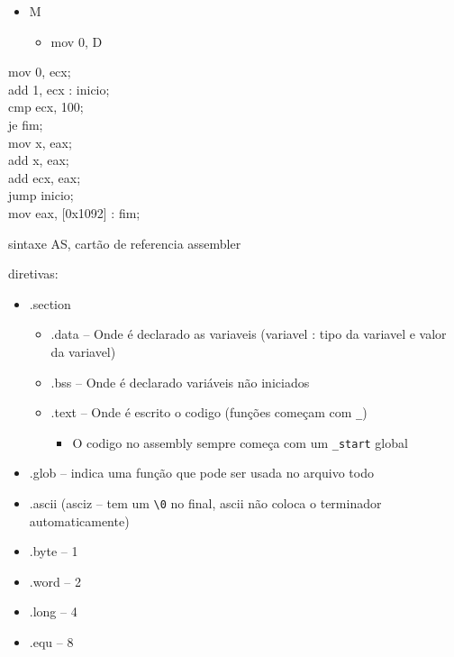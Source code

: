 \documentclass[12pt]{article}
\begin{document}
\begin{itemize}
\begin{itemize}
        \begin{itemize}
            \item Jump
            \item J?
            \begin{itemize}
                \item e
                \item g
                \item l
                \item ge
                \item le
                \item z
                \item \ldots
            \end{itemize}
        \end{itemize}
        \item M
        \begin{itemize}
            \item mov 0, D
        \end{itemize}
    \end{itemize}
\end{itemize}
mov 0, ecx;\\
add 1, ecx : inicio;\\
cmp ecx, 100;\\
je fim;\\
mov x, eax;\\
add x, eax;\\
add ecx, eax;\\
jump inicio;\\
mov eax, [0x1092] : fim;

sintaxe AS, cartão de referencia assembler

diretivas:
\begin{itemize}
    \item .section
    \begin{itemize}
        \item .data -- Onde é declarado as variaveis (variavel : tipo da 
        variavel e valor da variavel)
        \item .bss -- Onde é declarado variáveis não iniciados
        \item .text -- Onde é escrito o codigo (funções começam com \verb|_|)
        \begin{itemize}
            \item O codigo no assembly sempre começa com um \verb|_start| global
        \end{itemize}
    \end{itemize}
    \item .glob -- indica uma função que pode ser usada no arquivo todo
    \item .ascii (asciz -- tem um \verb|\0| no final, ascii não coloca o 
    terminador automaticamente)
    \item .byte -- 1
    \item .word -- 2
    \item .long -- 4
    \item .equ -- 8
\end{itemize}
\end{document}
